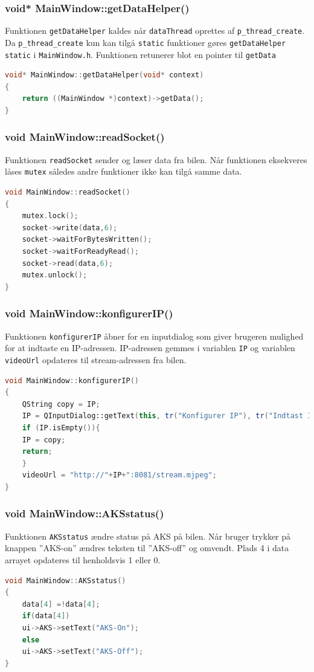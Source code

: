 \subsubsection{void* MainWindow::getDataHelper()}
Funktionen \texttt{getDataHelper} kaldes når \texttt{dataThread} oprettes af \texttt{p\_thread\_create}. Da \texttt{p\_thread\_create} kun kan tilgå \texttt{static} funktioner gøres \texttt{getDataHelper} \texttt{static} i \texttt{MainWindow.h}. Funktionen retunerer blot en pointer til \texttt{getData}
\begin{lstlisting}[caption={getDataHelper},label=lst:getDatahelper, language=c++]
void* MainWindow::getDataHelper(void* context)
{
    return ((MainWindow *)context)->getData();
}
\end{lstlisting}

\subsubsection{void MainWindow::readSocket()}
Funktionen \texttt{readSocket} sender og læser data fra bilen. Når funktionen eksekveres låses \texttt{mutex} således andre funktioner ikke kan tilgå samme data.
\begin{lstlisting}[caption={readSocket},label=lst:readSocket, language=c++]
void MainWindow::readSocket()
{   
    mutex.lock();
    socket->write(data,6);
    socket->waitForBytesWritten();
    socket->waitForReadyRead();
    socket->read(data,6);
    mutex.unlock();
}
\end{lstlisting}

\subsubsection{void MainWindow::konfigurerIP()}
Funktionen \texttt{konfigurerIP} åbner for en inputdialog som giver brugeren mulighed for at indtaste en IP-adressen. IP-adressen gemmes i variablen \texttt{IP} og variablen \texttt{videoUrl} opdateres til stream-adressen fra bilen.
\begin{lstlisting}[caption={konfigurerIP},label=lst:konfigurerIP, language=c++]
void MainWindow::konfigurerIP()
{
    QString copy = IP;
    IP = QInputDialog::getText(this, tr("Konfigurer IP"), tr("Indtast IP adressen"), QLineEdit::Normal,IP);
    if (IP.isEmpty()){
    IP = copy;
    return;
    }
    videoUrl = "http://"+IP+":8081/stream.mjpeg";
}
\end{lstlisting}

\subsubsection{void MainWindow::AKSstatus()}
Funktionen \texttt{AKSstatus} ændre status på AKS på bilen. Når bruger trykker på knappen ''AKS-on'' ændres teksten til ''AKS-off'' og omvendt. Plads 4 i data arrayet opdateres til henholdsvis 1 eller 0. 
\begin{lstlisting}[caption={AKSstatus},label=lst:AKSstatus, language=c++]
void MainWindow::AKSstatus()
{
    data[4] =!data[4];
    if(data[4])
    ui->AKS->setText("AKS-On");
    else
    ui->AKS->setText("AKS-Off");
}
\end{lstlisting}

